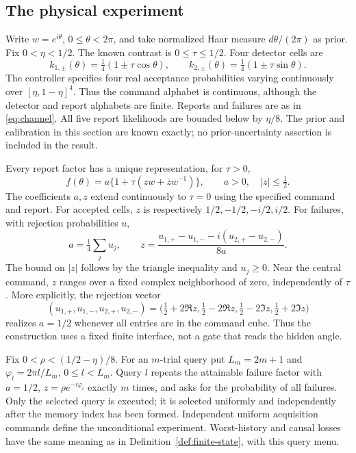 \documentclass[11pt]{amsart}
\theoremstyle{definition}\newtheorem{definition}[theorem]{Definition}
\theoremstyle{remark}\newtheorem{remark}[theorem]{Remark}
\begin{document}
\subsection{The physical experiment}
Write $w=e^{i\theta}$, $0\le\theta<2\pi$, and take normalized Haar
measure $d\theta/(2\pi)$ as prior. Fix $0<\eta<1/2$. The known
contrast is $0\le\tau\le1/2$. Four detector cells are
\begin{equation}\label{eq:circle-cells}
 k_{1,\pm}(\theta)=\tfrac14(1\pm\tau\cos\theta),\qquad
 k_{2,\pm}(\theta)=\tfrac14(1\pm\tau\sin\theta).
\end{equation}
The controller specifies four real acceptance probabilities varying
continuously over $[\eta,1-\eta]^4$. Thus the command alphabet is
continuous, although the detector and report alphabets are finite. Reports and failures are as in
\eqref{eq:channel}. All five report likelihoods are bounded below by
$\eta/8$. The prior and calibration in this section are known exactly;
no prior-uncertainty assertion is included in the result.

Every report factor has a unique representation, for $\tau>0$,
\begin{equation}\label{eq:circle-factor}
 f(\theta)=a\{1+\tau(z w+\bar z w^{-1})\},
 \qquad a>0,\quad |z|\le\tfrac12.
\end{equation}
The coefficients $a,z$ extend continuously to $\tau=0$ using the
specified command and report. For accepted cells, $z$ is respectively
$1/2,-1/2,-i/2,i/2$. For failures, with rejection probabilities $u$,
\begin{equation}\label{eq:circle-command-coordinates}
 a=\tfrac14\sum_j u_j,\qquad
 z=\frac{u_{1,+}-u_{1,-}-i(u_{2,+}-u_{2,-})}{8a}.
\end{equation}
The bound on $|z|$ follows by the triangle inequality and $u_j\ge0$.
Near the central command, $z$ ranges over a fixed complex neighborhood
of zero, independently of $\tau$. More explicitly, the rejection vector
\begin{equation}\label{eq:circle-right-inverse}
 (u_{1,+},u_{1,-},u_{2,+},u_{2,-})
 =\bigl(\tfrac12+2\Re z,\tfrac12-2\Re z,
        \tfrac12-2\Im z,\tfrac12+2\Im z\bigr)
\end{equation}
realizes $a=1/2$ whenever all entries are in the command cube.
Thus the construction uses a fixed finite interface, not a gate that
reads the hidden angle.

Fix $0<\rho<(1/2-\eta)/8$. For an $m$-trial query put
$L_m=2m+1$ and $\varphi_l=2\pi l/L_m$, $0\le l<L_m$.
Query $l$ repeats the attainable failure factor with
$a=1/2$, $z=\rho e^{-i\varphi_l}$ exactly $m$ times, and asks for
the probability of all failures. Only the selected query is executed;
it is selected uniformly and independently after the memory index has
been formed. Independent uniform acquisition commands define the
unconditional experiment. Worst-history and causal losses have the same
meaning as in Definition~\ref{def:finite-state}, with this query menu.
\end{document}
